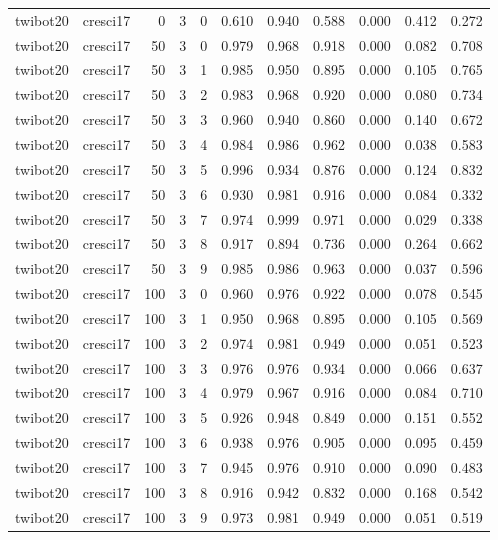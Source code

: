 \begin{tabular}{llrrrrrrrrr}
twibot20 & cresci17 & 0 & 3 & 0 & 0.610 & 0.940 & 0.588 & 0.000 & 0.412 & 0.272 \\
twibot20 & cresci17 & 50 & 3 & 0 & 0.979 & 0.968 & 0.918 & 0.000 & 0.082 & 0.708 \\
twibot20 & cresci17 & 50 & 3 & 1 & 0.985 & 0.950 & 0.895 & 0.000 & 0.105 & 0.765 \\
twibot20 & cresci17 & 50 & 3 & 2 & 0.983 & 0.968 & 0.920 & 0.000 & 0.080 & 0.734 \\
twibot20 & cresci17 & 50 & 3 & 3 & 0.960 & 0.940 & 0.860 & 0.000 & 0.140 & 0.672 \\
twibot20 & cresci17 & 50 & 3 & 4 & 0.984 & 0.986 & 0.962 & 0.000 & 0.038 & 0.583 \\
twibot20 & cresci17 & 50 & 3 & 5 & 0.996 & 0.934 & 0.876 & 0.000 & 0.124 & 0.832 \\
twibot20 & cresci17 & 50 & 3 & 6 & 0.930 & 0.981 & 0.916 & 0.000 & 0.084 & 0.332 \\
twibot20 & cresci17 & 50 & 3 & 7 & 0.974 & 0.999 & 0.971 & 0.000 & 0.029 & 0.338 \\
twibot20 & cresci17 & 50 & 3 & 8 & 0.917 & 0.894 & 0.736 & 0.000 & 0.264 & 0.662 \\
twibot20 & cresci17 & 50 & 3 & 9 & 0.985 & 0.986 & 0.963 & 0.000 & 0.037 & 0.596 \\
twibot20 & cresci17 & 100 & 3 & 0 & 0.960 & 0.976 & 0.922 & 0.000 & 0.078 & 0.545 \\
twibot20 & cresci17 & 100 & 3 & 1 & 0.950 & 0.968 & 0.895 & 0.000 & 0.105 & 0.569 \\
twibot20 & cresci17 & 100 & 3 & 2 & 0.974 & 0.981 & 0.949 & 0.000 & 0.051 & 0.523 \\
twibot20 & cresci17 & 100 & 3 & 3 & 0.976 & 0.976 & 0.934 & 0.000 & 0.066 & 0.637 \\
twibot20 & cresci17 & 100 & 3 & 4 & 0.979 & 0.967 & 0.916 & 0.000 & 0.084 & 0.710 \\
twibot20 & cresci17 & 100 & 3 & 5 & 0.926 & 0.948 & 0.849 & 0.000 & 0.151 & 0.552 \\
twibot20 & cresci17 & 100 & 3 & 6 & 0.938 & 0.976 & 0.905 & 0.000 & 0.095 & 0.459 \\
twibot20 & cresci17 & 100 & 3 & 7 & 0.945 & 0.976 & 0.910 & 0.000 & 0.090 & 0.483 \\
twibot20 & cresci17 & 100 & 3 & 8 & 0.916 & 0.942 & 0.832 & 0.000 & 0.168 & 0.542 \\
twibot20 & cresci17 & 100 & 3 & 9 & 0.973 & 0.981 & 0.949 & 0.000 & 0.051 & 0.519 \\

\end{tabular}
